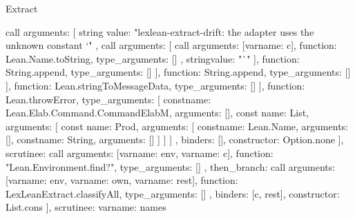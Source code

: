 \begin{lexlean}{Extract}
\begin{toolingmodule}
{{{{{{{{{                            call{
                              arguments: [
                                string{
                                  value: "lexlean-extract-drift: the adapter uses the unknown constant `"
                                },
                                call{
                                  arguments: [
                                    call{
                                      arguments: [var{name: c}],
                                      function: Lean.Name.toString,
                                      type_arguments: []
                                    },
                                    string{value: "`"}
                                  ],
                                  function: String.append,
                                  type_arguments: []
                                }
                              ],
                              function: String.append,
                              type_arguments: []
                            }
                          ],
                          function: Lean.stringToMessageData,
                          type_arguments: []
                        }
                      ],
                      function: Lean.throwError,
                      type_arguments: [
                        const{name: Lean.Elab.Command.CommandElabM, arguments: []},
                        const{
                          name: List,
                          arguments: [
                            const{
                              name: Prod,
                              arguments: [
                                const{name: Lean.Name, arguments: []},
                                const{name: String, arguments: []}
                              ]
                            }
                          ]
                        }
                      ]
                    },
                    binders: [],
                    constructor: Option.none
                  }
                ],
                scrutinee: call{
                  arguments: [var{name: env}, var{name: c}],
                  function: "Lean.Environment.find?",
                  type_arguments: []
                }
              },
              then_branch: call{
                arguments: [var{name: env}, var{name: own}, var{name: rest}],
                function: LexLeanExtract.classifyAll,
                type_arguments: []
              }
            },
            binders: [c, rest],
            constructor: List.cons
          }
        ],
        scrutinee: var{name: names}
}}}
\end{toolingmodule}
\end{lexlean}
